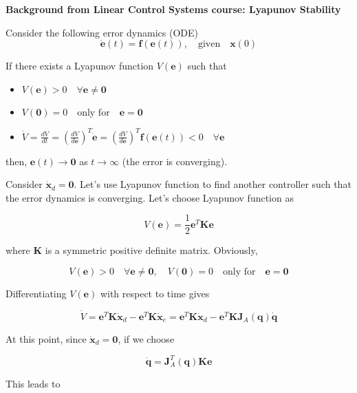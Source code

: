 \documentclass[10pt]{article}
\begin{document}
\begin{shaded}
    \textbf{Background from Linear Control Systems course: Lyapunov Stability}

Consider the following error dynamics (ODE)
$$
\dot{\boldsymbol{e}}(t)=\boldsymbol{f}(\boldsymbol{e}(t)),\quad \text{given}\quad \boldsymbol{x}(0)
$$

If there exists  a Lyapunov function $V(\boldsymbol{e})$ such that 
\begin{itemize}
    \item $ 
V(\boldsymbol{e})>0 \quad \forall \boldsymbol{e} \neq \mathbf{0}
$
\item $
V(\mathbf{0})=0 \quad \text{only for} \quad \boldsymbol{e}=\boldsymbol{0}
$
\item $
\dot{V}=\frac{dV}{dt}=(\frac{d V}{d\boldsymbol{e}})^T\dot{\boldsymbol{e}}=(\frac{d V}{d\boldsymbol{e}})^T \boldsymbol{f}(\boldsymbol{e}(t))<0 \quad \forall \boldsymbol{e} 
$
\end{itemize}
then, ${\boldsymbol{e}}(t)\rightarrow \boldsymbol{0}$ as $t\rightarrow \infty$ (the error is converging).

\end{shaded}

Consider $\dot{\boldsymbol{x}}_{d}=\mathbf{0}$.
Let's use Lyapunov function to find another controller such that the error dynamics is converging. Let's choose  Lyapunov function as

$$
V(\boldsymbol{e})=\frac{1}{2} \boldsymbol{e}^{T} \boldsymbol{K} \boldsymbol{e}
$$

where $\boldsymbol{K}$ is a symmetric positive definite matrix. Obviously,

$$
V(\boldsymbol{e})>0 \quad \forall \boldsymbol{e} \neq \mathbf{0}, \quad V(\mathbf{0})=0 \quad \text{only for} \quad \boldsymbol{e}=\boldsymbol{0}
$$

Differentiating $V(\boldsymbol{e})$ with respect to time gives

$$
\dot{V}=\boldsymbol{e}^{T} \boldsymbol{K} \dot{\boldsymbol{x}}_{d}-\boldsymbol{e}^{T} \boldsymbol{K} \dot{\boldsymbol{x}}_{e}=\boldsymbol{e}^{T} \boldsymbol{K} \dot{\boldsymbol{x}}_{d}-\boldsymbol{e}^{T} \boldsymbol{K} \boldsymbol{J}_{A}(\boldsymbol{q}) \dot{\boldsymbol{q}}
$$


At this point, since $\boldsymbol{\dot{x}}_d=\boldsymbol{0}$, if we choose

$$
\dot{\boldsymbol{q}}=\boldsymbol{J}_{A}^{T}(\boldsymbol{q}) \boldsymbol{K} \boldsymbol{e}
$$

This leads to
\end{document}
